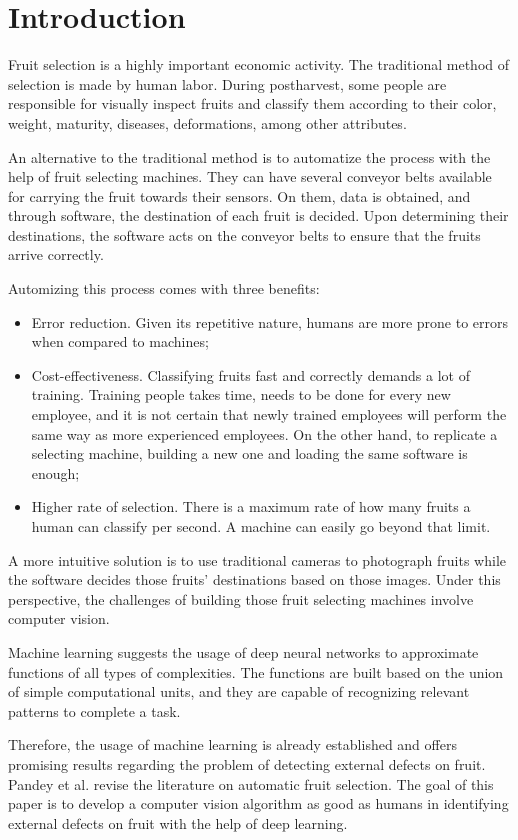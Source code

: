 \documentclass[../main.tex]{subfile}
\begin{document}
\section{Introduction} \label{sec:introduction}
    Fruit selection is a highly important economic activity. The traditional method of selection is made by human labor. During postharvest, some people are responsible for visually inspect fruits and classify them according to their color, weight, maturity, diseases, deformations, among other attributes.
    
    An alternative to the traditional method is to automatize the process with the help of fruit selecting machines. They can have several conveyor belts available for carrying the fruit towards their sensors. On them, data is obtained, and through software, the destination of each fruit is decided. Upon determining their destinations, the software acts on the conveyor belts to ensure that the fruits arrive correctly.
    
    Automizing this process comes with three benefits:
    \begin{itemize}
        \item Error reduction. Given its repetitive nature, humans are more prone to errors when compared to machines;
        
        \item Cost-effectiveness. Classifying fruits fast and correctly demands a lot of training. Training people takes time, needs to be done for every new employee, and it is not certain that newly trained employees will perform the same way as more experienced employees. On the other hand, to replicate a selecting machine, building a new one and loading the same software is enough;
        
        \item Higher rate of selection. There is a maximum rate of how many fruits a human can classify per second. A machine can easily go beyond that limit.
    \end{itemize}
    
    A more intuitive solution is to use traditional cameras to photograph fruits while the software decides those fruits' destinations based on those images. Under this perspective, the challenges of building those fruit selecting machines involve computer vision.
    
    Machine learning suggests the usage of deep neural networks to approximate functions of all types of complexities. The functions are built based on the union of simple computational units, and they are capable of recognizing relevant patterns to complete a task.
    
    Therefore, the usage of machine learning is already established and offers promising results regarding the problem of detecting external defects on fruit. Pandey et al. \cite{I-item1} revise the literature on automatic fruit selection. The goal of this paper is to develop a computer vision algorithm as good as humans in identifying external defects on fruit with the help of deep learning.
    
\end{document}

